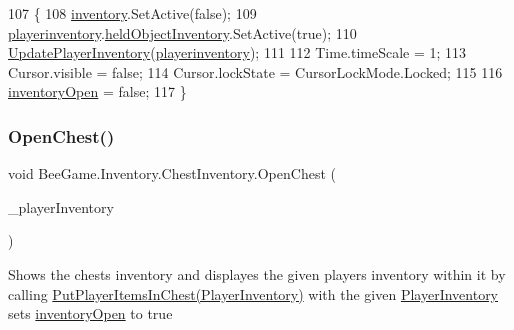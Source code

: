 \begin{DoxyCode}
107         \{
108             \hyperlink{class_bee_game_1_1_inventory_1_1_chest_inventory_ac6fe8eed65557a7eb99e56d201c55466}{inventory}.SetActive(\textcolor{keyword}{false});
109             \hyperlink{class_bee_game_1_1_inventory_1_1_chest_inventory_a79ff450013724b84c1c21858c63404b0}{playerinventory}.\hyperlink{class_bee_game_1_1_inventory_1_1_player_inventory_a595e1144315e0e9be0b825b538643e1f}{heldObjectInventory}.SetActive(\textcolor{keyword}{true});
110             \hyperlink{class_bee_game_1_1_inventory_1_1_chest_inventory_a426c17adf8e95a36e24f9793f6c90b48}{UpdatePlayerInventory}(\hyperlink{class_bee_game_1_1_inventory_1_1_chest_inventory_a79ff450013724b84c1c21858c63404b0}{playerinventory});
111             
112             Time.timeScale = 1;
113             Cursor.visible = \textcolor{keyword}{false};
114             Cursor.lockState = CursorLockMode.Locked;
115 
116             \hyperlink{class_bee_game_1_1_inventory_1_1_chest_inventory_a3e3529178934f2a4a8e91529c148457c}{inventoryOpen} = \textcolor{keyword}{false};
117         \}
\end{DoxyCode}
\mbox{\label{class_bee_game_1_1_inventory_1_1_chest_inventory_a67be88b98076c96c0dd4450093a21c20}} 
\subsubsection{\texorpdfstring{Open\+Chest()}{OpenChest()}}
{\footnotesize\ttfamily void Bee\+Game.\+Inventory.\+Chest\+Inventory.\+Open\+Chest (\begin{DoxyParamCaption}\item[{\hyperlink{class_bee_game_1_1_inventory_1_1_player_inventory}{Player\+Inventory}}]{\+\_\+player\+Inventory }\end{DoxyParamCaption})}



Shows the chests inventory and displayes the given players inventory within it by calling \hyperlink{class_bee_game_1_1_inventory_1_1_chest_inventory_ac08125dcf875928b702044b7a7b22a01}{Put\+Player\+Items\+In\+Chest(\+Player\+Inventory)} with the given \hyperlink{class_bee_game_1_1_inventory_1_1_player_inventory}{Player\+Inventory} sets \hyperlink{class_bee_game_1_1_inventory_1_1_chest_inventory_a3e3529178934f2a4a8e91529c148457c}{inventory\+Open} to true 


